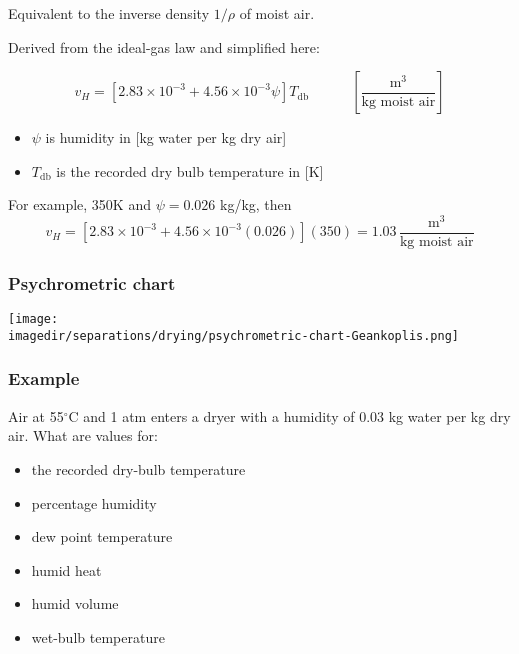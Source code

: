 \begin{frame}\frametitle{{\color{purple}{Humid volume}}}

	Equivalent to the inverse density $1/\rho$ of moist air.

	\vspace{12pt}
	Derived from the ideal-gas law and simplified here:  %
	\begin{exampleblock}{}
		\[ v_H = \left[ 2.83 \times 10^{-3} + 4.56 \times 10^{-3} \psi \right] T_\text{db} \qquad\quad \left[\frac{\text{m}^3}{\text{kg moist air}}\right] \]
	\end{exampleblock}
	\begin{itemize}
		\item	$\psi$ is humidity in [kg water per kg dry air]
		\item	$T_\text{db}$ is the recorded dry bulb temperature in [K]
	\end{itemize}

	\vspace{12pt}
	For example, 350K and $\psi = 0.026$ kg/kg, then
	\[v_H = \left[2.83 \times 10^{-3} + 4.56 \times 10^{-3}(0.026)\right](350)  = 1.03\, \frac{\text{m}^3}{\text{kg moist air}}\]
\end{frame}

\begin{frame}\frametitle{Psychrometric chart}
	\vfill
	\begin{center}
		\texttt{[image: \\imagedir/separations/drying/psychrometric-chart-Geankoplis.png]}
	\end{center}
\end{frame}

\begin{frame}\frametitle{Example}
	Air at 55$^\circ$C and 1 atm enters a dryer with a humidity of 0.03 kg water per kg dry air. What are values for:

	\vspace{12pt}
	\begin{itemize}
		\item	the recorded dry-bulb temperature \visible<2->{ {\color{myOrange}[55$^\circ$C]}}
		\item	percentage humidity  \visible<2->{{\color{myOrange}[26\%]}}
		\item	dew point temperature  \visible<2->{{\color{myOrange}[$\approx 31^\circ$C]}}
		\item	humid heat   \visible<2->{{\color{myOrange}$\left[c_S = 1.061 \dfrac{\text{kJ}}{\text{(kg dry air)(K)}}\right]$}}
		\item	humid volume  \visible<2->{{\color{myOrange}[$T=328\text{K}$; $v_H = 0.973 \text{m}^3/(\text{kg moist air})$ ]}}
		\item	wet-bulb temperature \visible<2->{ {\color{myOrange}[$\approx 36^\circ$C]}}
	\end{itemize}

\end{frame}

